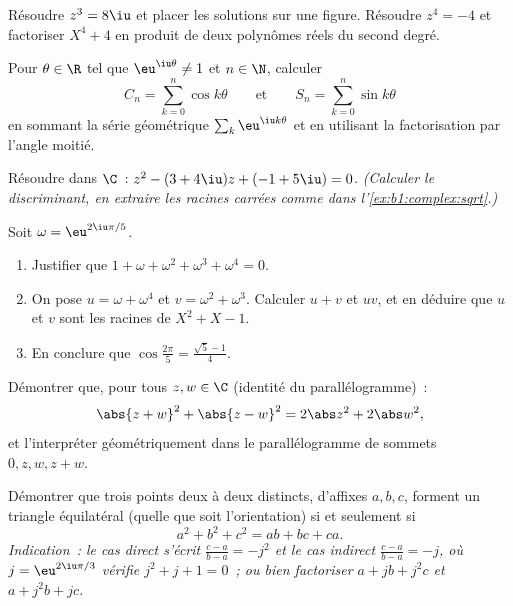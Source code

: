\begin{exercise}[$\star$]\label{exo:b1:complex:5}
Résoudre $z^3 = 8\iu$ et placer les solutions sur une figure. Résoudre
$z^4 = -4$ et factoriser $X^4 + 4$ en produit de deux polynômes réels
du second degré.
\end{exercise}

\begin{exercise}[$\star\star$]\label{exo:b1:complex:6}
Pour $\theta \in \R$ tel que $\eu^{\iu\theta} \neq 1$ et $n \in \N$,
calculer
\[
C_n = \sum_{k=0}^{n} \cos k\theta
\qquad\text{et}\qquad
S_n = \sum_{k=0}^{n} \sin k\theta
\]
en sommant la série géométrique $\sum_k \eu^{\iu k\theta}$ et en
utilisant la factorisation par l'angle moitié.
\end{exercise}

\begin{exercise}[$\star\star$]\label{exo:b1:complex:7}
Résoudre dans $\C$~: $z^2 - (3 + 4\iu) z + (-1 + 5\iu) = 0$.
\emph{(Calculer le discriminant, en extraire les racines carrées comme
dans l'\cref{ex:b1:complex:sqrt}.)}
\end{exercise}

\begin{exercise}[$\star\star$]\label{exo:b1:complex:8}
Soit $\omega = \eu^{2\iu\pi/5}$.
\begin{enumerate}
  \item Justifier que $1 + \omega + \omega^2 + \omega^3 + \omega^4 =
        0$.
  \item On pose $u = \omega + \omega^4$ et $v = \omega^2 + \omega^3$.
        Calculer $u + v$ et $uv$, et en déduire que $u$ et $v$ sont
        les racines de $X^2 + X - 1$.
  \item En conclure que $\cos\frac{2\pi}{5} = \frac{\sqrt 5 - 1}{4}$.
\end{enumerate}
\end{exercise}

\begin{exercise}[$\star\star$]\label{exo:b1:complex:9}
Démontrer que, pour tous $z, w \in \C$ (identité du
parallélogramme)~:
\[
\abs{z + w}^2 + \abs{z - w}^2 = 2\abs z^2 + 2\abs w^2 ,
\]
et l'interpréter géométriquement dans le parallélogramme de sommets
$0, z, w, z + w$.
\end{exercise}

\begin{exercise}[$\star\star\star$]\label{exo:b1:complex:10}
Démontrer que trois points deux à deux distincts, d'affixes $a, b, c$,
forment un triangle équilatéral (quelle que soit l'orientation) si et
seulement si
\[
a^2 + b^2 + c^2 = ab + bc + ca .
\]
\emph{Indication~: le cas direct s'écrit $\frac{c-a}{b-a} = -j^2$ et
le cas indirect $\frac{c-a}{b-a} = -j$, où $j = \eu^{2\iu\pi/3}$
vérifie $j^2 + j + 1 = 0$~; ou bien factoriser $a + jb + j^2c$ et $a +
j^2 b + jc$.}
\end{exercise}

